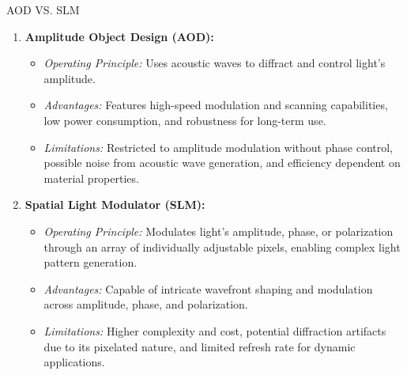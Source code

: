 \documentclass[18 pt]{beamer}
\begin{document}
\begin{frame}{AOD VS. SLM}
  \begin{enumerate}[itemsep=10pt]
    \item \textbf{Amplitude Object Design (AOD):}
    \begin{itemize}[itemsep=5pt]
      \small
      \item \textit{Operating Principle:} Uses acoustic waves to diffract and control light's amplitude.
      \item \textit{Advantages:} Features high-speed modulation and scanning capabilities, low power consumption, and robustness for long-term use.
      \item \textit{Limitations:} Restricted to amplitude modulation without phase control, possible noise from acoustic wave generation, and efficiency dependent on material properties.
    \end{itemize}
    \item \textbf{Spatial Light Modulator (SLM):}
    \begin{itemize}[itemsep=5pt]
        \item \small \textit{Operating Principle:} Modulates light's amplitude, phase, or polarization through an array of individually adjustable pixels, enabling complex light pattern generation.
        \item \textit{Advantages:} Capable of intricate wavefront shaping and modulation across amplitude, phase, and polarization.
        \item \textit{Limitations:} Higher complexity and cost, potential diffraction artifacts due to its pixelated nature, and limited refresh rate for dynamic applications.
    \end{itemize}
  \end{enumerate}
\end{frame}

\end{document}
